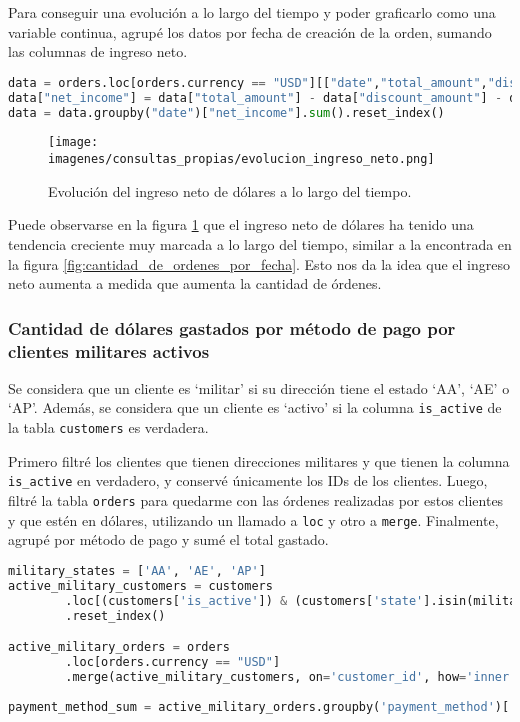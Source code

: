 Para conseguir una evolución a lo largo del tiempo y poder graficarlo como una variable continua, agrupé los datos por fecha de creación de la orden, sumando las columnas de ingreso neto.

\begin{lstlisting}[language=Python, xleftmargin=25pt, xrightmargin=25pt]
data = orders.loc[orders.currency == "USD"][["date","total_amount","discount_amount","tax_amount"]]
data["net_income"] = data["total_amount"] - data["discount_amount"] - data["tax_amount"]
data = data.groupby("date")["net_income"].sum().reset_index()
\end{lstlisting}

\begin{figure}[H]
    \centering
    \texttt{[image: imagenes/consultas\_propias/evolucion\_ingreso\_neto.png]}
    \caption{Evolución del ingreso neto de dólares a lo largo del tiempo.}
    \label{fig:ingreso_neto}
\end{figure}

Puede observarse en la figura \ref{fig:ingreso_neto} que el ingreso neto de dólares ha tenido una tendencia creciente muy marcada a lo largo del tiempo, similar a la encontrada en la figura \ref{fig:cantidad_de_ordenes_por_fecha}. Esto nos da la idea que el ingreso neto aumenta a medida que aumenta la cantidad de órdenes.

\subsubsection{Cantidad de dólares gastados por método de pago por clientes militares activos}

Se considera que un cliente es `militar' si su dirección tiene el estado `AA', `AE' o `AP'. Además, se considera que un cliente es `activo' si la columna \texttt{is\_active} de la tabla \texttt{customers} es verdadera.

Primero filtré los clientes que tienen direcciones militares y que tienen la columna \texttt{is\_active} en verdadero, y conservé únicamente los IDs de los clientes. Luego, filtré la tabla \texttt{orders} para quedarme con las órdenes realizadas por estos clientes y que estén en dólares, utilizando un llamado a \texttt{loc} y otro a \texttt{merge}. Finalmente, agrupé por método de pago y sumé el total gastado.

\begin{lstlisting}[language=Python, xleftmargin=25pt, xrightmargin=25pt]
military_states = ['AA', 'AE', 'AP']
active_military_customers = customers
        .loc[(customers['is_active']) & (customers['state'].isin(military_states))]['customer_id']
        .reset_index()

active_military_orders = orders
        .loc[orders.currency == "USD"]
        .merge(active_military_customers, on='customer_id', how='inner')
        
payment_method_sum = active_military_orders.groupby('payment_method')['total_amount'].sum()
\end{lstlisting}

